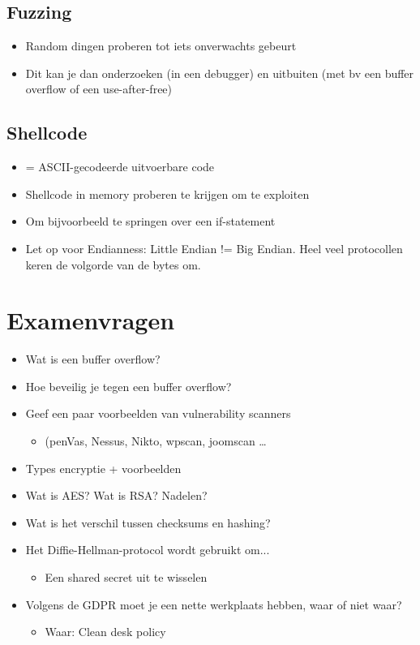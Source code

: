 \documentclass{article}
\begin{document}
\subsection{Fuzzing}

\begin{itemize}
    \item Random dingen proberen tot iets onverwachts gebeurt
    \item Dit kan je dan onderzoeken (in een debugger) en uitbuiten (met bv een buffer overflow of een use-after-free)
\end{itemize}

\subsection{Shellcode}

\begin{itemize}
    \item = ASCII-gecodeerde uitvoerbare code
    \item Shellcode in memory proberen te krijgen om te exploiten
    \item Om bijvoorbeeld te springen over een if-statement
    \item Let op voor Endianness: Little Endian != Big Endian. Heel veel protocollen keren de volgorde van de bytes om.
\end{itemize}


\section{Examenvragen}

\begin{itemize}
    \item Wat is een buffer overflow?
    \item Hoe beveilig je tegen een buffer overflow?
    \item Geef een paar voorbeelden van vulnerability scanners 
    \begin{itemize}
        \item (penVas, Nessus, Nikto, wpscan, joomscan \dots
    \end{itemize}
    \item Types encryptie + voorbeelden
    \item Wat is AES? Wat is RSA? Nadelen?
    \item Wat is het verschil tussen checksums en hashing?
    \item Het Diffie-Hellman-protocol wordt gebruikt om...
    \begin{itemize}
        \item Een shared secret uit te wisselen 
    \end{itemize}
    \item Volgens de GDPR moet je een nette werkplaats hebben, waar of niet waar?
    \begin{itemize}
        \item Waar: Clean desk policy
    \end{itemize}
\end{itemize}
\end{document}
